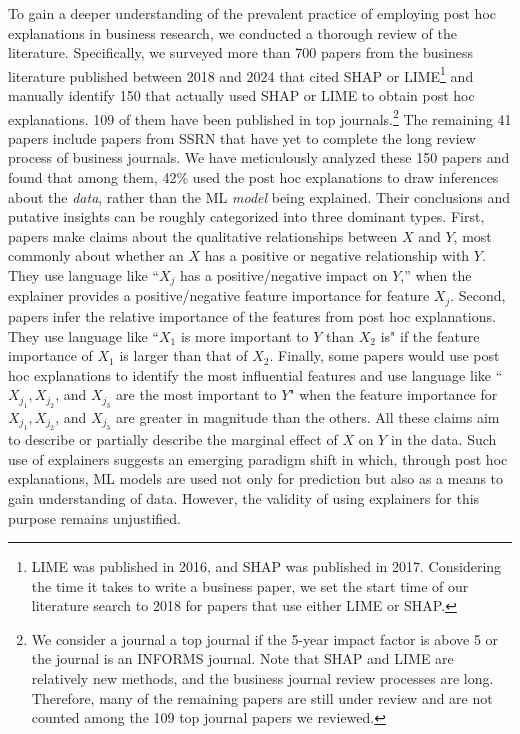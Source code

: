 \documentclass[12pt]{article}  %
\begin{document}
To gain a deeper understanding of the prevalent practice of employing post hoc explanations in business research, we conducted a thorough review of the literature. Specifically, we surveyed more than 700 papers from the business literature published between 2018 and 2024  that cited SHAP or LIME\footnote{LIME was published in 2016, and SHAP was published in 2017. Considering the time it takes to write a business paper, we set the start time of our literature search to 2018 for papers that use either LIME or SHAP.}  and manually identify 150 that actually used SHAP or LIME to obtain post hoc explanations. 109 of them have been published in top journals.\footnote{We consider a journal a top journal if the 5-year impact factor is above 5 or the journal is an INFORMS journal. Note that SHAP and LIME are relatively new methods, and the business journal review processes are long. Therefore, many of the remaining papers are still under review and are not counted among the 109 top journal papers we reviewed.} The remaining 41 papers include papers from SSRN that have yet to complete the long review process of business journals. We have meticulously analyzed these 150 papers and found that among them, 42\% used the post hoc explanations to draw inferences about the \textit{data}, rather than the ML \textit{model} being explained. Their conclusions and putative insights can be roughly categorized into three dominant types. First, papers make claims about the qualitative relationships between $X$ and $Y$, most commonly about whether an $X$ has a positive or negative relationship with $Y$. They use language like ``$X_j$ has a positive/negative impact on $Y$,'' when the explainer provides a positive/negative feature importance for feature $X_j$. Second, papers infer the relative importance of the features from post hoc explanations. They use language like ``$X_1$ is more important to $Y$ than $X_2$ is" if the feature importance of $X_1$ is larger than that of $X_2$. Finally, some papers would use post hoc explanations to identify the most influential features and use language like ``$X_{j_1}, X_{j_2}$, and $X_{j_3}$ are the most important to $Y$" when the feature importance for $X_{j_1}, X_{j_2}$, and $X_{j_3}$ are greater in magnitude than the others. All these claims aim to describe or partially describe the marginal effect of $X$ on $Y$ in the data. 
Such use of explainers suggests an emerging paradigm shift in which, through post hoc explanations, ML models are used not only for prediction but also as a means to gain understanding of data. However, the validity of using explainers for this purpose remains unjustified. 
\end{document}
